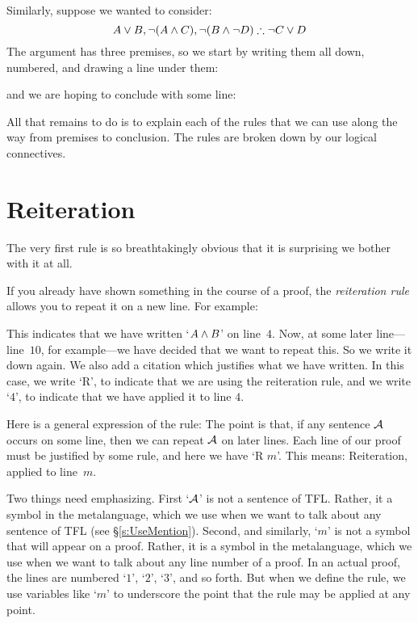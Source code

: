Similarly, suppose we wanted to consider:
$$A\eor B, \enot (A\eand C), \enot (B \eand \enot D) \therefore \enot C\eor D$$
The argument has three premises, so we start by writing them all down, numbered, and drawing a line under them:
\begin{fitchproof}
\end{fitchproof}
and we are hoping to conclude with some line:
\begin{fitchproof}
\end{fitchproof}
All that remains to do is to explain each of the rules that we can use along the way from premises to conclusion. The rules are broken down by our logical connectives.

\section{Reiteration}
The very first rule is so breathtakingly obvious that it is surprising we bother with it at all.

If you already have shown something in the course of a proof, the \emph{reiteration rule} allows you to repeat it on a new line. For example:
\begin{fitchproof}
	\have[$\vdots$]{}{\vdots}
	 
\end{fitchproof}
This indicates that we have written `$A \wedge B$' on line~$4$. Now, at some later line---line~$10$, for example---we have decided that we want to repeat this. So we write it down again. We also add a citation which justifies what we have written. In this case, we write `R', to indicate that we are using the reiteration rule, and we write `$4$', to indicate that we have applied it to line $4$.

Here is a general expression of the rule:
The point is that, if any sentence $\mathcal{A}$ occurs on some line, then we can repeat $\mathcal{A}$ on later lines. Each line of our proof must be justified by some rule, and here we have `R $m$'. This means: Reiteration, applied to line~$m$.

Two things need emphasizing. First `$\mathcal{A}$' is not a sentence of TFL. Rather, it a symbol in the metalanguage, which we use when we want to talk about any sentence of TFL (see \S\ref{s:UseMention}). Second, and similarly, `$m$' is not a symbol that will appear on a proof. Rather, it is a symbol in the metalanguage, which we use when we want to talk about any line number of a proof. In an actual proof, the lines are numbered `$1$', `$2$', `$3$', and so forth. But when we define the rule, we use variables like `$m$' to underscore the point that the rule may be applied at any point.

